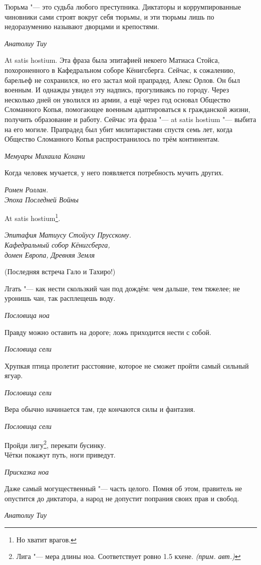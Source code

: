 \documentclass[a4paper,10pt]{book}
\newcommand{\authornote}{\textit{(прим. авт.)}}
\begin{document}
\epigraph{Тюрьма "--- это судьба любого преступника. 
Диктаторы и коррумпированные чиновники сами строят вокруг себя тюрьмы, и эти тюрьмы лишь по недоразумению называют дворцами и крепостями.}
{\textit{Анатолиу Тиу}}

\epigraph{At satis hostium.
Эта фраза была эпитафией некоего Матиаса Стойса, похороненного в Кафедральном соборе Кёнигсберга.
Сейчас, к сожалению, барельеф не сохранился, но его застал мой прапрадед, Алекс Орлов.
Он был военным.
И однажды увидел эту надпись, прогуливаясь по городу.
Через несколько дней он уволился из армии, а ещё через год основал Общество Сломанного Копья, помогающее военным адаптироваться к гражданской жизни, получить образование и работу.
Сейчас эта фраза "--- at satis hostium "--- выбита на его могиле.
Прапрадед был убит милитаристами спустя семь лет, когда Общество Сломанного Копья распространилось по трём континентам.}
{\textit{Мемуары Михаила Кохани}}

\epigraph{Когда человек мучается, у него появляется потребность мучить других.}
{\textit{Ромен Роллан.\\Эпоха Последней Войны}}

\epigraph{At satis hostium\footnote{Но хватит врагов.}.}
{\textit{Эпитафия Матиусу Стойусу Прусскому.\\Кафедральный собор 
Кёнигсберга,\\домен Европа, Древняя Земля}}

(Последняя встреча Гало и Тахиро!)

\epigraph{Лгать "--- как нести скользкий чан под дождём: чем дальше, тем тяжелее;
не уронишь чан, так расплещешь воду.}
{\textit{Пословица ноа}}

\epigraph{Правду можно оставить на дороге;
ложь приходится нести с собой.}
{\textit{Пословица сели}}

\epigraph{Хрупкая птица пролетит расстояние, которое не сможет пройти самый сильный ягуар.}
{\textit{Пословица сели}}

\epigraph{Вера обычно начинается там, где кончаются силы и фантазия.}
{\textit{Пословица сели}}

\epigraph{Пройди лигу\footnote
{Лига "--- мера длины ноа. Соответствует ровно 1.5 кхене. \authornote}, перекати бусинку.\\
Чётки покажут путь, ноги приведут.}
{\textit{Присказка ноа}}

\epigraph{Даже самый могущественный "--- часть целого.
Помня об этом, правитель не опустится до диктатора, а народ не допустит попрания своих прав и свобод.}
{\textit{Анатолиу Тиу}}
\end{document}
